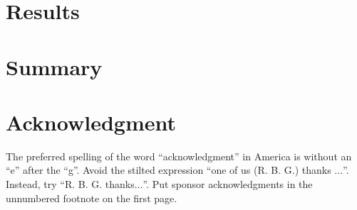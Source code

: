 \documentclass[conference]{IEEEtran}
\begin{document}
\section{Results}

\cite{nagl2003}

\section{Summary}

\section*{Acknowledgment}

The preferred spelling of the word ``acknowledgment'' in America is without 
an ``e'' after the ``g''. Avoid the stilted expression ``one of us (R. B. 
G.) thanks $\ldots$''. Instead, try ``R. B. G. thanks$\ldots$''. Put sponsor 
acknowledgments in the unnumbered footnote on the first page.



\end{document}
